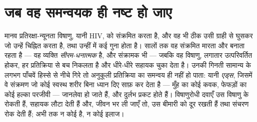 \section{जब वह समन्वयक ही नष्ट हो जाए}

\begin{proposition}[HIV और एड्स]\label{prop:g12:adaptive-immunity:hiv}
मानव प्रतिरक्षा-न्यूनता विषाणु, यानी HIV,  को संक्रमित करता
है, और वह भी ठीक उसी ग्राही से घुसकर जो उन्हें चिह्नित करता है, तथा उन्हीं
में कई गुना होता है। सालों तक वह  संक्रमित  मारता
और  बनाता रहता है --- वह व्यक्ति \emph{सीरम-धनात्मक} है, और
संक्रामक भी --- जबकि वह विषाणु, लगातार उत्परिवर्तित होकर, हर प्रतिक्रिया से
बच निकलता है और धीरे-धीरे सहायक  चुका देता है। उनकी गिनती सामान्य के
लगभग पाँचवें हिस्से से नीचे गिरे तो अनुकूली प्रतिक्रिया का समन्वय ही नहीं हो
पाता: यानी \emph{एड्स}, जिसमें वे संक्रमण जो कोई स्वस्थ शरीर
बिना ध्यान दिए साफ़ कर देता है --- मुँह का कोई कवक, फेफड़ों का कोई हल्का
परजीवी --- जानलेवा हो जाते हैं, और दुर्लभ  प्रकट होते हैं। विषाणुरोधी
दवाएँ उस विषाणु के  रोकती हैं, सहायक  लौटा देती हैं और, जीवन
भर ली जाएँ तो, उस बीमारी को दूर रखती हैं तथा संचरण रोक देती हैं; अभी तक न
कोई  है, न कोई इलाज।
\end{proposition}
\admitted

